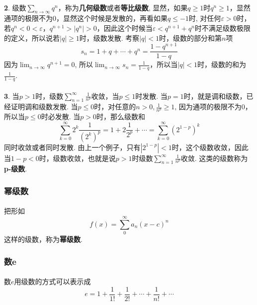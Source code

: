 \paragraph{}
\textbf{2}. 级数$\sum_{n\to \infty} q^n$，称为\textbf{几何级数}或者\textbf{等比级数}, 显然，如果$q \geq 1$时$q^n \geq 1$，显然通项的极限不为0，显然这个时候是发散的，再看如果$q \leq -1$时, 对任何$\varepsilon > 0$时，若$ q^n < 0 < \varepsilon $，$q ^{n + 1} > | q^n | > 0$，因此这个时候当$\varepsilon < q^{n+1} + q^{n}$时不满足级数极限的定义，所以说若$|q| \geq 1$时，级数发散. 考察$|q| < 1$时，级数的部分和第$n$项
$$
s_n = 1 + q + \cdots + q^n = \frac{1 - q^{n+1}}{1 -q}
$$
因为$\lim_{n\to \infty}q^{n+1} = 0$,  所以$\lim_{n\to \infty} s_n = \frac{1}{1 - q}$，所以当$|q| < 1$时，级数的和为$\frac{1}{1-q}$.


\paragraph{}
\textbf{3}. 当$p > 1$时，级数$\sum_{n=1}^\infty \frac{1}{n^p}$收敛，当$p \leq 1$时发散. 当$p = 1$时，就是调和级数，已经证明调和级数发散.  当$p \leq 0$时，对任意的$n > 0, \frac{1}{n^p} \geq 1$, 因为通项的极限不为0，所以当$p \leq 0$时必发散.  当$p > 0$时，那么级数和
$$
\sum_{k=0}^\infty 2^k \frac{1}{(2^k)^p} = 1 + 2 \frac{1}{2^p} + \cdots  = \sum_{k=0}^\infty (2^{1-p})^k
$$
同时收敛或者同时发散. 由上一个例子，只有$|2^{1-p}| < 1$时，这个级数收敛，因此当$1 -p < 0$时，级数收敛，也就是说$p > 1$时级数$\sum_{n=1}^\infty \frac{1}{n^p}$收敛. 这类的级数称为\textbf{p-级数}.


\subsubsection{幂级数}
\paragraph{}
把形如
$$
f(x) = \sum_0^\infty a_n (x - c)^n
$$
这样的级数，称为\textbf{幂级数}. 

\subsubsection{数e}
\paragraph{}
数$e$用级数的方式可以表示成
$$
e = 1 + \frac{1}{1!} + \frac{1}{2!} + \cdots + \frac{1}{n!} + \cdots
$$

